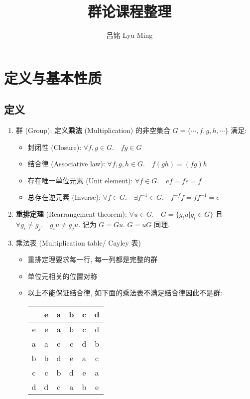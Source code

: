 \documentclass[12pt,a4paper]{article}%
\numberwithin{equation}{section}%
\begin{document}
\title{群论课程整理}
\author{吕铭 Lyu Ming}
\maketitle
\tableofcontents
\section{定义与基本性质} %
\label{sec:def}
\subsection{定义} %
\label{sub:def}
\begin{enumerate}
	\item 群 (Group): 定义\textbf{乘法} (Multiplication) 的非空集合 $G = \{\cdots, f, g,h,\cdots\}$ 满足:
	\begin{itemize}
		\item 封闭性 (Closure): $\forall f,g\in G.\quad fg\in G$
		\item 结合律 (Associative law): $\forall f,g,h\in G.\quad f(gh) = (fg)h$
		\item 存在唯一单位元素 (Unit element): $\forall f\in G.\quad ef = fe = f$
		\item 总存在逆元素 (Inverse): $\forall f\in G.\quad \exists f^{-1}\in G.\quad f^{-f}f = ff^{-1} = e$
	\end{itemize}
	\item \textbf{重排定理} (Rearrangement theorem): $\forall u\in G.\quad G = \{g_iu|g_i\in G\}$ 且 $\forall g_i\neq g_j.\quad g_i u\neq g_j u$. 记为 $G = Gu$. $G = uG$ 同理.
	\item 乘法表 (Multiplication table/ Cayley 表)
	\begin{itemize}
		\item 重排定理要求每一行, 每一列都是完整的群
		\item 单位元相关的位置对称
		\item 以上不能保证结合律, 如下面的乘法表不满足结合律因此不是群:\\
		\begin{center}
		\begin{tabular}{c|ccccc}
		  & e & a & b & c & d \\ \hline
		e & e & a & b & c & d \\
		a & a & e & c & d & b \\
		b & b & d & e & a & c \\
		c & c & b & d & e & a \\
		d & d & c & a & b & e \\

\end{tabular}
\end{center}
\end{itemize}
\end{enumerate}
\end{document}
